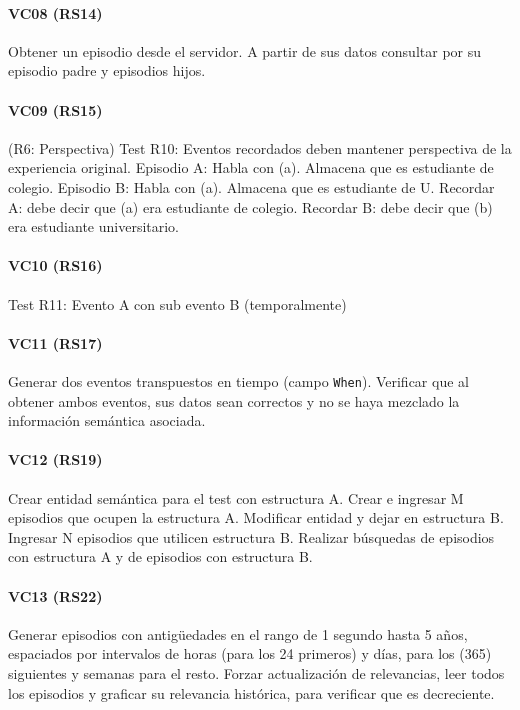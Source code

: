 \paragraph{VC08 (RS14)}
Obtener un episodio desde el servidor. A partir de sus datos consultar por su episodio padre y episodios hijos.

\paragraph{VC09 (RS15)}
(R6: Perspectiva)
Test R10: Eventos recordados deben mantener perspectiva de la experiencia original.
Episodio A: Habla con (a). Almacena que es estudiante de colegio.
Episodio B: Habla con (a). Almacena que es estudiante de U.
Recordar A: debe decir que (a) era estudiante de colegio.
Recordar B: debe decir que (b) era estudiante universitario. 

\paragraph{VC10 (RS16)}
Test R11: Evento A con sub evento B (temporalmente)



\paragraph{VC11 (RS17)}
Generar dos eventos transpuestos en tiempo (campo \texttt{When}). Verificar que al obtener ambos eventos, sus datos sean correctos y no se haya mezclado la información semántica asociada.


\paragraph{VC12 (RS19)}
Crear entidad semántica para el test con estructura A. Crear e ingresar M episodios que ocupen la estructura A. Modificar entidad y dejar en estructura B. Ingresar N episodios que utilicen estructura B. Realizar búsquedas de episodios con estructura A y de episodios con estructura B.


\paragraph{VC13 (RS22)}
Generar episodios con antigüedades en el rango de 1 segundo hasta 5 años, espaciados por intervalos de horas (para los 24 primeros) y días, para los (365) siguientes y semanas para el resto. Forzar actualización de relevancias, leer todos los episodios y graficar su relevancia histórica, para verificar que es decreciente.

